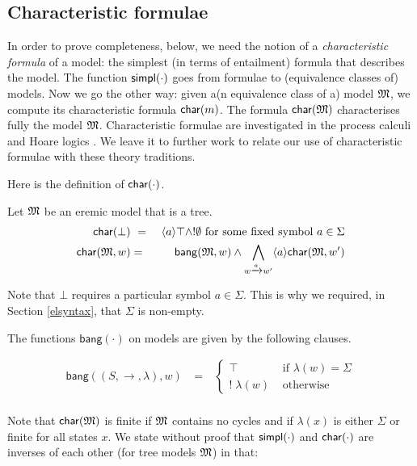 \subsection{Characteristic formulae}

In order to prove completeness, below, we need the notion of a
\emph{characteristic formula} of a model: the simplest (in terms of
entailment) formula that describes the model.
The function $\mathsf{simpl}(\cdot)$ goes from formulae to (equivalence
classes of) models. Now we go the other way: given a(n equivalence
class of a) model $\frak{M}$, we compute its characteristic formula
$\mathsf{char}(m)$. The formula $\mathsf{char}(\frak{M})$ characterises fully the model
$\frak{M}$.  Characteristic formulae are investigated in the process
calculi \cite{AcetoL:chaforfata} and Hoare logics
\cite{HondaK:descriptive,ChargueraudA:provertcf}.  We leave it to
further work to relate our use of characteristic formulae with these
theory traditions. 

Here is the definition of $\mathsf{char}(\cdot)$.

\begin{definition}
Let $\frak{M}$ be an eremic model that is a tree.
\begin{eqnarray*}
  \mathsf{char}(\bot) &\ =\ & \langle a \rangle \top \land ! \emptyset  \mbox{ for some fixed symbol }a \in \Sigma  \\
  \mathsf{char}(\frak{M}, w) & = & \mathsf{bang}(\frak{M},w) \land \bigwedge_{w \xrightarrow{a} w'} \langle a \rangle \mathsf{char}(\frak{M}, w')  
\end{eqnarray*}

\end{definition}

\NI Note that $\bot$ requires a particular symbol $a \in \Sigma$. This
is why we required, in Section \ref{elsyntax}, that $\Sigma$ is
non-empty.

\NI The functions $\mathsf{bang}(\cdot)$ on models are given by the
following clauses.

\begin{eqnarray*}
  \mathsf{bang}((S,\rightarrow,\lambda),w) 
     & \ = \ & 
  \begin{cases}
    \top & \mbox{ if } \lambda(w) = \Sigma  \\
    ! \; \lambda(w) & \mbox{ otherwise }  
  \end{cases} \\
\end{eqnarray*}

\NI Note that $\mathsf{char}(\frak{M})$ is finite if $\frak{M}$ contains no cycles and
if $\lambda(x)$ is either $\Sigma$ or finite for all states $x$.  We
state without proof that $\mathsf{simpl}(\cdot)$ and $\mathsf{char}(\cdot)$ are
inverses of each other (for tree models $\frak{M}$) in that:

